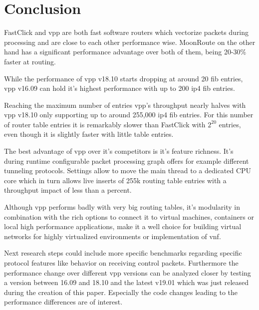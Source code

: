 \chapter{Conclusion}

FastClick and \Ac{vpp} are both fast software routers which vectorize
packets during processing and are close to each other performance
wise. MoonRoute on the other hand has a significant performance
advantage over both of them, being 20-30\% faster at routing.

While the performance of \Ac{vpp} v18.10 starts dropping at around 20
\Ac{fib} entries, \Ac{vpp} v16.09 can hold it's highest performance
with up to 200 \Ac{ip4} \Ac{fib} entries. 

Reaching the maximum number of entries \Ac{vpp}'s throughput nearly
halves with \Ac{vpp} v18.10 only supporting up to around 255,000
\Ac{ip4} \Ac{fib} entries. For this number of router table entries it
is remarkably slower than FastClick with $2^{20}$ entries, even though
it is slightly faster with little table entries.

The best advantage of \Ac{vpp} over it's competitors is it's feature
richness. It's during runtime configurable packet processing graph
offers for example different tunneling protocols. Settings allow to
move the main thread to a dedicated CPU core which in turn allows live
inserts of 255k routing table entries with a throughput impact of less
than a percent.

Although \Ac{vpp} performs badly with very big routing tables, it's
modularity in combination with the rich options to connect it to
virtual machines, containers or local high performance applications,
make it a well choice for building virtual networks for highly
virtualized environments or implementation of \Ac{vnf}.

Next research steps could include more specific benchmarks regarding
specific protocol features like behavior on receiving control packets.
Furthermore the performance change over different \Ac{vpp} versions
can be analyzed closer by testing a version between 16.09 and 18.10
and the latest v19.01 which was just released during the creation of
this paper. Especially the code changes leading to the performance
differences are of interest.
